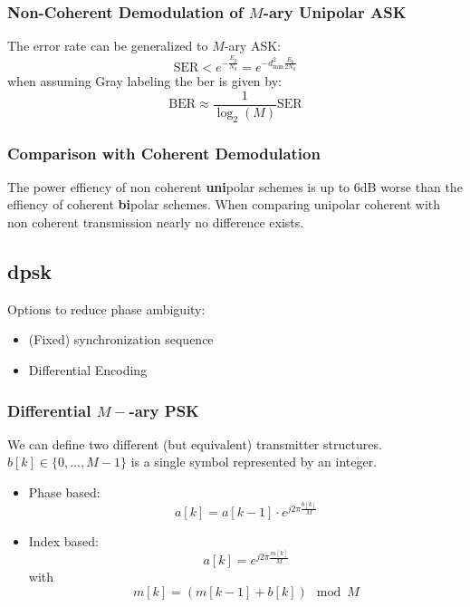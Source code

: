 \subsubsection{Non-Coherent Demodulation of $M$-ary Unipolar ASK}
The error rate can be generalized to $M$-ary ASK:
\begin{equation}
    \text{SER} < e^{-\frac{E_g}{N_0}} = e^{-d_\text{min}^2 \frac{E_b}{2 N_0}}
\end{equation}
when assuming Gray labeling the \ac{ber} is given by:
\begin{equation}
    \text{BER} \approx \frac{1}{\log_2(M)} \text{SER}
\end{equation}

\subsubsection{Comparison with Coherent Demodulation}
The power effiency of non coherent \textbf{uni}polar schemes is up to
6dB worse than the effiency of coherent \textbf{bi}polar schemes. When comparing
unipolar coherent with non coherent transmission nearly no difference exists.

\subsection{\acl{dpsk}}
Options to reduce phase ambiguity:
\begin{itemize}
    \item (Fixed) synchronization sequence
    \item Differential Encoding
\end{itemize}

\subsubsection{Differential $M-$-ary PSK}
We can define two different (but equivalent) transmitter structures. 
$b[k] \in \{0, \ldots, M-1\}$ is a single symbol represented by an integer.

\begin{itemize}
    \item Phase based:
        \begin{equation}
            a[k] = a[k-1] \cdot e^{j 2 \pi \frac{b[k]}{M}}
        \end{equation}
    \item Index based:
        \begin{equation}
            a[k] = e^{j 2 \pi \frac{m[k]}{M}}
        \end{equation}
        with
        \begin{equation}
            m[k] = (m[k-1] + b[k]) \mod M
        \end{equation}
\end{itemize}

